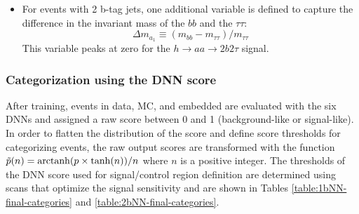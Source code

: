 \begin{itemize}
    \item For events with 2 b-tag jets, one additional variable is defined to capture the difference in the invariant mass of the $bb$ and the $\tau\tau$:
        \begin{equation}
            \Delta m_{a_1} \equiv (m_{bb} - m_{\tau\tau})/{m_{\tau\tau}}
        \end{equation}
    This variable peaks at zero for the $h\rightarrow aa \rightarrow 2b2\tau$ signal.
\end{itemize}

\subsubsection{Categorization using the DNN score}

After training, events in data, MC, and embedded are evaluated with the six DNNs and assigned a raw score between 0 and 1 (background-like or signal-like). In order to flatten the distribution of the score and define score thresholds for categorizing events, the raw output scores are transformed with the function $\tilde{p}(n) = \operatorname{arctanh}(p \times \tanh(n))/n$ where $n$ is a positive integer. The thresholds of the DNN score used for signal/control region definition are determined using scans that optimize the signal sensitivity and are shown in Tables \ref{table:1bNN-final-categories} and \ref{table:2bNN-final-categories}.


